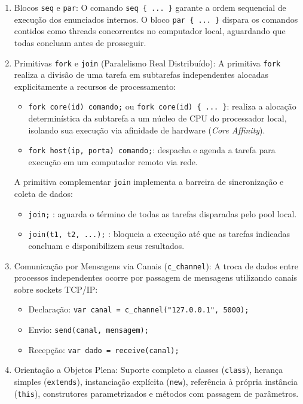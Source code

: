 \begin{enumerate}
    \item Blocos \texttt{seq} e \texttt{par}:
    O comando \texttt{seq \{ ... \}} garante a ordem sequencial de execução dos enunciados internos. O bloco \texttt{par \{ ... \}} dispara os comandos contidos como threads concorrentes no computador local, aguardando que todas concluam antes de prosseguir.
    
    \item Primitivas \texttt{fork} e \texttt{join} (Paralelismo Real Distribuído):
    A primitiva \texttt{fork} realiza a divisão de uma tarefa em subtarefas independentes alocadas explicitamente a recursos de processamento:
    \begin{itemize}
        \item \texttt{fork core(id) comando;} ou \texttt{fork core(id) \{ ... \}}: realiza a alocação determinística da subtarefa a um núcleo de CPU do processador local, isolando sua execução via afinidade de hardware (\textit{Core Affinity}).
        \item \texttt{fork host(ip, porta) comando;}: despacha e agenda a tarefa para execução em um computador remoto via rede.
    \end{itemize}
    A primitiva complementar \texttt{join} implementa a barreira de sincronização e coleta de dados:
    \begin{itemize}
        \item \texttt{join;} : aguarda o término de todas as tarefas disparadas pelo pool local.
        \item \texttt{join(t1, t2, ...);} : bloqueia a execução até que as tarefas indicadas concluam e disponibilizem seus resultados.
    \end{itemize}

    \item Comunicação por Mensagens via Canais (\texttt{c\_channel}):
    A troca de dados entre processos independentes ocorre por passagem de mensagens utilizando canais sobre sockets TCP/IP:
    \begin{itemize}
        \item Declaração: \texttt{var canal = c\_channel("127.0.0.1", 5000);}
        \item Envio: \texttt{send(canal, mensagem);}
        \item Recepção: \texttt{var dado = receive(canal);}
    \end{itemize}

    \item Orientação a Objetos Plena:
    Suporte completo a classes (\texttt{class}), herança simples (\texttt{extends}), instanciação explícita (\texttt{new}), referência à própria instância (\texttt{this}), construtores parametrizados e métodos com passagem de parâmetros.
\end{enumerate}

